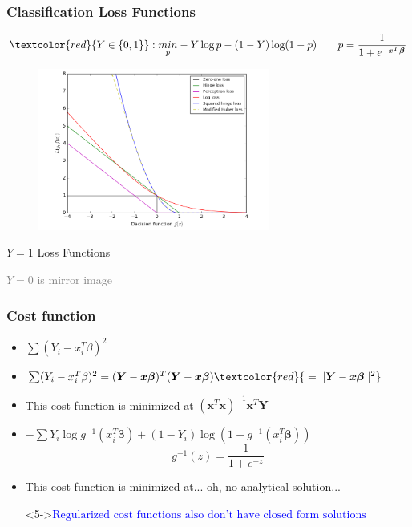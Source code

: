 \documentclass[xcolor={dvipsnames}]{beamer}
\begin{document}
\frame
{
\frametitle{Classification Loss Functions}

\vspace{-.85in}

$$\textcolor{red}{Y \in \{0,1\}}: \underset{p}{min}-Y \log p - (1 - Y) \log (1-p) \quad\quad p = \frac{1}{1+e^{-x^T\boldsymbol\beta}}$$

\vspace{-.25in}

\begin{figure}
\centering
\includegraphics[width=3in]{loss.png} 
\end{figure}

\small
\vspace{-1.5in}
\hspace{2in}$Y=1$ Loss Functions

\hspace{2in}\textcolor{gray}{$Y=0$ is mirror image}


}


\frame
{
\normalsize
\frametitle{Cost function}

\begin{itemize}
\item<1> $\sum (Y_i - x_i^T\beta)^2$ 
\vspace{-1.5em}
\item<2-> $\sum (Y_i - x_i^T\beta)^2 = ({\boldsymbol Y} - {\boldsymbol x}{\boldsymbol\beta})^T({\boldsymbol Y} - {\boldsymbol x}{\boldsymbol\beta}) \textcolor{red}{\;= ||{\boldsymbol Y} - {\boldsymbol x}{\boldsymbol\beta}||^2}$ 
\item<3->[] This cost function is minimized at $\left({\boldsymbol x}^T{\boldsymbol x} \right)^{-1} {\boldsymbol x}^T {\boldsymbol Y}$
\item[]
\item[]
\item $-\sum Y_i \log g^{-1}(x_i^T{\boldsymbol \beta}) + (1 - Y_i) \log \left(1-g^{-1}(x_i^T {\boldsymbol \beta})\right)$ \\
$$g^{-1}(z) = \frac{1}{1+e^{-z}} $$
\item<4->[] This cost function is minimized at... \footnotesize oh, no analytical solution... \normalsize
\item[]<5->\textcolor{blue}{$\text{Regularized cost functions also don't have closed form solutions}$}
\end{itemize}
}
\end{document}

